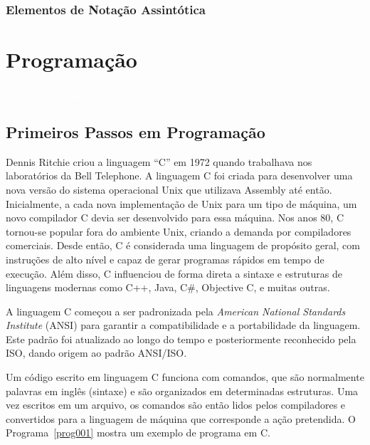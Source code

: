 \documentclass[11pt,fleqn]{book} %
\begin{document}
\subsection{Elementos de Notação Assintótica}




\chapter{Programação}\label{programacao}
\vspace{6em}
\begin{flushright}
	\textit{\textcolor{white}{Um bonita citação...}}
\end{flushright}
\vspace{12em}



\newpage
\section{Primeiros Passos em Programação}\label{disc:primeirospassos}

Dennis Ritchie criou a linguagem ``C'' em 1972 quando trabalhava nos laboratórios da Bell Telephone.
A linguagem C foi criada para desenvolver uma nova versão do sistema operacional Unix que utilizava Assembly até então.
Inicialmente, a cada nova implementação de Unix para um tipo de máquina, um novo compilador C devia ser desenvolvido para essa máquina.
Nos anos 80, C tornou-se popular fora do ambiente Unix, criando a demanda por compiladores comerciais.
Desde então, C é considerada uma linguagem de propósito geral, com instruções de alto nível e capaz de gerar programas rápidos em tempo de execução.
Além disso, C influenciou de forma direta a sintaxe e estruturas de linguagens modernas como C++, Java, C\#, Objective C, e muitas outras.

A linguagem C começou a ser padronizada pela \textit{American National Standards Institute} (ANSI) para garantir a compatibilidade e a portabilidade da linguagem.
Este padrão foi atualizado ao longo do tempo e posteriormente reconhecido pela ISO, dando origem ao padrão ANSI/ISO.

Um código escrito em linguagem C funciona com comandos, que são normalmente palavras em inglês (sintaxe) e são organizados em determinadas estruturas.
Uma vez escritos em um arquivo, os comandos são então lidos pelos compiladores e convertidos para a linguagem de máquina que corresponde a ação pretendida.
O Programa~\ref{prog001} mostra um exemplo de programa em C.
\end{document}
